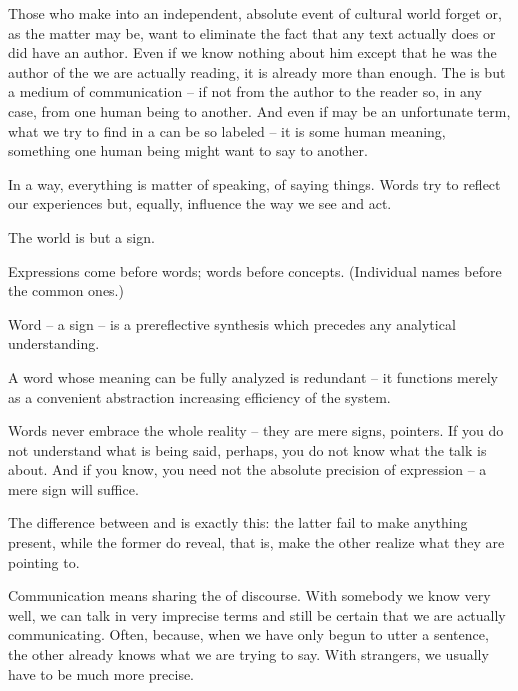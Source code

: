 Those who make  into an independent, absolute event of 
cultural world forget or, as the matter may be, want to eliminate the 
fact that any text actually does or did have an author. Even if we 
know nothing about him except that he was the author of the 
 we are actually reading, it is already more than enough. 
The  is but a medium of communication -- if not from the 
author to the reader so, in any case, from one human being to 
another. And even if  may be an unfortunate 
term, what we try to find in a  can be so labeled -- it is 
some human meaning, something one human being might want to say to 
another.

\pa
In a way, everything is matter of speaking, of saying things. Words 
try to reflect our experiences but, equally, influence the way we see 
and act.

\pa
The world is but a sign.

\pa
Expressions come before words; words before concepts. (Individual names 
before the common ones.)

\pa
Word -- a sign -- is a prereflective synthesis which precedes any 
analytical understanding.

\pa
A word whose meaning can be fully analyzed is redundant -- it
functions merely as a convenient abstraction increasing efficiency of the 
system.


\pa
Words never embrace the whole reality -- they are mere signs,
pointers. If you do not understand what is being said, perhaps, you do
not know what the talk is about. And if you know, you need not the
absolute precision of expression -- a mere sign will suffice.

\pa
The difference between  and  is exactly 
this: the latter fail to make anything present, while the former do 
reveal, that is, make the other realize what they are pointing to. 

\pa 
Communication means sharing the  of discourse. With 
somebody we know very well, we can talk in very imprecise terms and 
still be certain that we are actually communicating. Often, because, 
when we have only begun to utter a sentence, the other already knows 
what we are trying to say. With strangers, we usually have to be much 
more precise.

